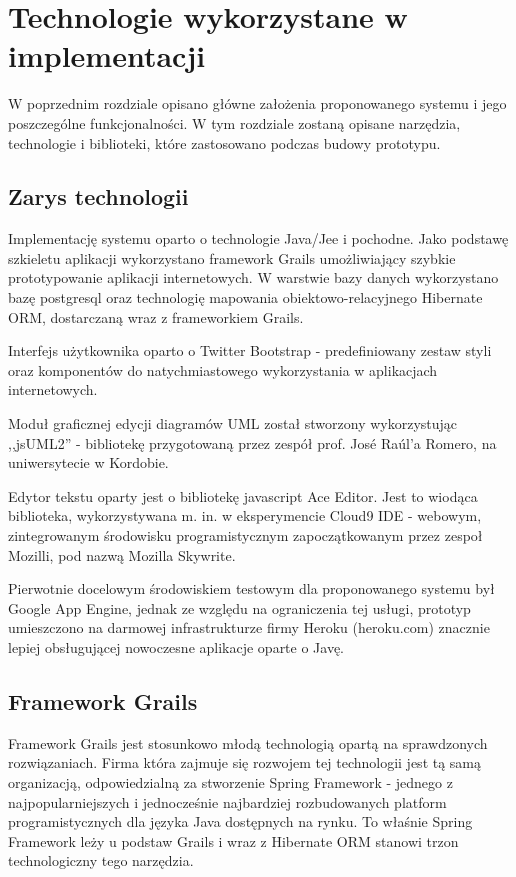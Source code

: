 \chapter{Technologie wykorzystane w implementacji}
  
  W poprzednim rozdziale opisano główne założenia proponowanego systemu i jego poszczególne funkcjonalności. W tym rozdziale zostaną opisane narzędzia, technologie i biblioteki, które zastosowano podczas budowy prototypu.

  \section{Zarys technologii}
    
    Implementację systemu oparto o technologie Java/Jee i pochodne. Jako podstawę szkieletu aplikacji wykorzystano framework Grails umożliwiający szybkie prototypowanie aplikacji internetowych. W warstwie bazy danych wykorzystano bazę postgresql oraz technologię mapowania obiektowo-relacyjnego Hibernate ORM, dostarczaną wraz z frameworkiem Grails. 
    
    Interfejs użytkownika oparto o Twitter Bootstrap - predefiniowany zestaw styli oraz komponentów do natychmiastowego wykorzystania w aplikacjach internetowych. 

    Moduł graficznej edycji diagramów UML został stworzony wykorzystując ,,jsUML2'' - bibliotekę przygotowaną przez zespół prof. José Raúl'a Romero, na uniwersytecie w Kordobie. 

    Edytor tekstu oparty jest o bibliotekę javascript Ace Editor. Jest to wiodąca biblioteka, wykorzystywana m. in. w eksperymencie Cloud9 IDE - webowym, zintegrowanym środowisku programistycznym zapoczątkowanym przez zespoł Mozilli, pod nazwą Mozilla Skywrite.
  
    Pierwotnie docelowym środowiskiem testowym dla proponowanego systemu był Google App Engine, jednak ze względu na ograniczenia tej usługi, prototyp umieszczono na darmowej infrastrukturze firmy Heroku (heroku.com) znacznie lepiej obsługującej nowoczesne aplikacje oparte o Javę.

  \section{Framework Grails}
    
    Framework Grails jest stosunkowo młodą technologią opartą na sprawdzonych rozwiązaniach. Firma która zajmuje się rozwojem tej technologii jest tą samą organizacją, odpowiedzialną za stworzenie Spring Framework - jednego z najpopularniejszych i jednocześnie najbardziej rozbudowanych platform programistycznych dla języka Java dostępnych na rynku. To właśnie Spring Framework leży u podstaw Grails i wraz z Hibernate ORM stanowi trzon technologiczny tego narzędzia.

